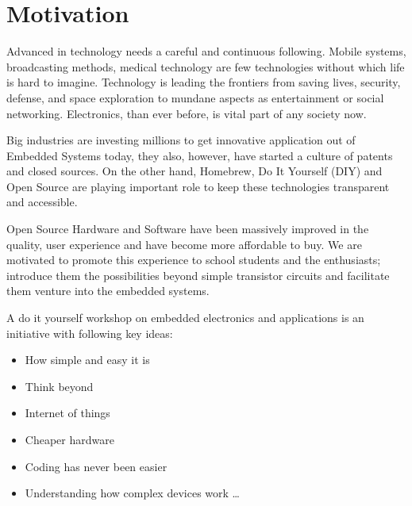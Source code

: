 \documentclass[12pt]{article} %
\begin{document}



\section{Motivation} %
Advanced in technology needs a careful and continuous following. Mobile systems, broadcasting methods, medical technology are few technologies without which life is hard to imagine. Technology is leading the frontiers from saving lives, security, defense, and space exploration to mundane aspects as entertainment or social networking. Electronics, than ever before, is vital part of any society now.\vspace{1mm}

Big industries are investing millions to get innovative application out of Embedded Systems today, they also, however, have started a culture of patents and closed sources. On the other hand, Homebrew, Do It Yourself (DIY) and Open Source are playing important role to keep these technologies transparent and accessible. \vspace{1mm}

Open Source Hardware and Software have been massively improved in the quality, user experience and have become more affordable to buy. We are motivated to promote this experience to school students and  the enthusiasts; introduce them the possibilities beyond simple transistor circuits and facilitate them venture into the embedded systems.\vspace{1mm}

A do it yourself workshop on embedded electronics and applications is an initiative with following key ideas:

\begin{itemize}
\item How simple and easy it is
\item Think beyond
\item Internet of things
\item Cheaper hardware
\item Coding has never been easier
\item Understanding how complex devices work \ldots
\end{itemize}
\end{document}
